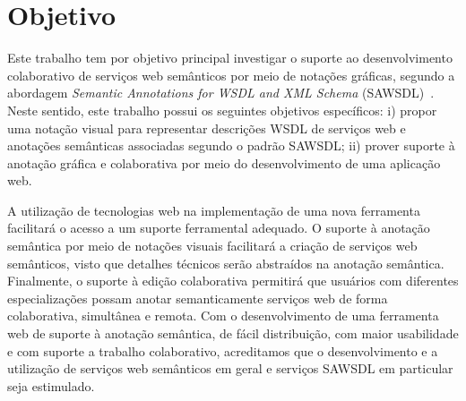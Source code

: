 \section{Objetivo}\label{1-introducao-objetivo}

Este trabalho tem por objetivo principal investigar o suporte ao desenvolvimento colaborativo de serviços web semânticos por meio de notações gráficas, segundo a abordagem \textit{Semantic Annotations for WSDL and XML Schema} (SAWSDL)~\cite{W3C-2007-SAWSDL}. Neste sentido, este trabalho possui os seguintes objetivos específicos: i) propor uma notação visual para representar descrições WSDL de serviços web e anotações semânticas associadas segundo o padrão SAWSDL; ii) prover suporte à anotação gráfica e colaborativa por meio do desenvolvimento de uma aplicação web.

A utilização de tecnologias web na implementação de uma nova ferramenta facilitará o acesso a um suporte ferramental adequado. O suporte à anotação semântica por meio de notações visuais facilitará a criação de serviços web semânticos, visto que detalhes técnicos serão abstraídos na anotação semântica. Finalmente, o suporte à edição colaborativa permitirá que usuários com diferentes especializações possam anotar semanticamente serviços web de forma colaborativa, simultânea e remota. Com o desenvolvimento de uma ferramenta web de suporte à anotação semântica, de fácil distribuição, com maior usabilidade e com suporte a trabalho colaborativo, acreditamos que o desenvolvimento e a utilização de serviços web semânticos em geral e serviços SAWSDL em particular seja estimulado.



